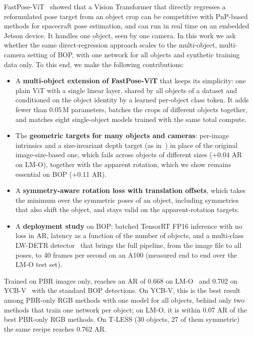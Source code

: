 FastPose-ViT~\cite{ancey2026fastposevit} showed that a Vision Transformer that directly regresses
a reformulated pose target from an object crop can be competitive with PnP-based methods for
spacecraft pose estimation, and can run in real time on an embedded Jetson device. It handles one
object, seen by one camera. In this work we ask whether the same direct-regression approach
scales to the multi-object, multi-camera setting of BOP, with one network for all objects and
synthetic training data only. To this end, we make the following contributions:
\begin{itemize}
  \item A \textbf{multi-object extension of FastPose-ViT} that keeps its simplicity: one plain
        ViT with a single linear layer, shared by all objects of a dataset and conditioned on the
        object identity by a learned per-object class token. It adds fewer than 0.05\,M
        parameters, batches the crops of different objects together, and matches eight
        single-object models trained with the same total compute.
  \item The \textbf{geometric targets for many objects and cameras}: per-image intrinsics and a
        size-invariant depth target (as in~\cite{stapf2023pvit6d}) in place of the original
        image-size-based one, which fails across objects of different sizes (+0.04 AR on LM-O),
        together with the apparent rotation, which we show remains essential on BOP (+0.11 AR).
  \item A \textbf{symmetry-aware rotation loss with translation offsets}, which takes the
        minimum over the symmetric poses of an object, including symmetries that also shift the
        object, and stays valid on the apparent-rotation targets.
  \item A \textbf{deployment study} on BOP: batched TensorRT FP16 inference with no loss in AR,
        latency as a function of the number of objects, and a multi-class LW-DETR
        detector~\cite{chen2024lwdetr} that brings the full pipeline, from the image file to all
        poses, to 40 frames per second on an A100 (measured end to end over the LM-O test set).
\end{itemize}
Trained on PBR images only, \ours{} reaches an AR of 0.668 on LM-O~\cite{brachmann2014lmo} and
0.702 on YCB-V~\cite{xiang2018posecnn} with the standard BOP detections. On YCB-V, this is the
best result among PBR-only RGB methods with one model for all objects, behind only two methods
that train one network per object; on LM-O, it is within 0.07 AR of the best PBR-only RGB methods.
On T-LESS (30 objects, 27 of them symmetric) the same recipe reaches 0.762 AR.
